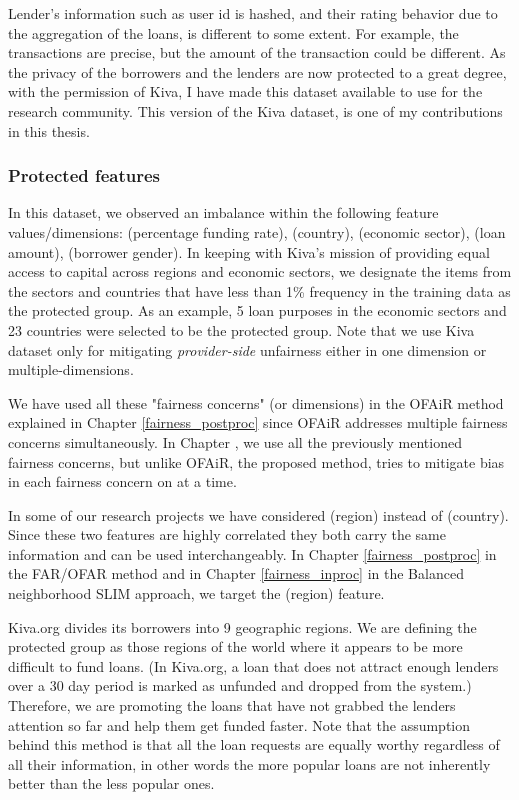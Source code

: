     Lender's information such as user id is hashed, and their rating behavior due to the aggregation of the loans, is different to some extent. For example, the transactions are precise, but the amount of the transaction could be different.
    As the privacy of the borrowers and the lenders are now protected to a great degree, with the permission of Kiva, I have made this dataset available to use for the research community. This version of the Kiva dataset, is one of my contributions in this thesis.


        \subsubsection{Protected features}
        In this dataset, we observed an imbalance within the following feature values/dimensions: (percentage funding rate), (country), (economic sector), (loan amount), (borrower gender). In keeping with Kiva's mission of providing equal access to capital across regions and economic sectors, we designate the items from the sectors and countries that have less than 1\% frequency in the training data as the protected group. As an example, 5 loan purposes in the economic sectors and 23 countries were selected to be the protected group. Note that we use Kiva dataset only for mitigating \textit{provider-side} unfairness either in one dimension or multiple-dimensions.
        
        We have used all these "fairness concerns" (or dimensions) in the OFAiR method explained in Chapter \ref{fairness_postproc} since OFAiR addresses multiple fairness concerns simultaneously. In Chapter , we use all the previously mentioned fairness concerns, but unlike OFAiR, the proposed method, tries to mitigate bias in each fairness concern on at a time.
        
        In some of our research projects we have considered (region) instead of (country). Since these two features are highly correlated they both carry the same information and can be used interchangeably. In Chapter \ref{fairness_postproc} in the FAR/OFAR method and in Chapter \ref{fairness_inproc} in the Balanced neighborhood SLIM approach, we target the (region) feature.
        
        Kiva.org divides its borrowers into 9 geographic regions. We are defining the protected group as those regions of the world where it appears to be more difficult to fund loans. (In Kiva.org, a loan that does not attract enough lenders over a 30 day period is marked as unfunded and dropped from the system.) Therefore, we are promoting the loans that have not grabbed the lenders attention so far and help them get funded faster. Note that the assumption behind this method is that all the loan requests are equally worthy regardless of all their information, in other words the more popular loans are not inherently better than the less popular ones.
        
